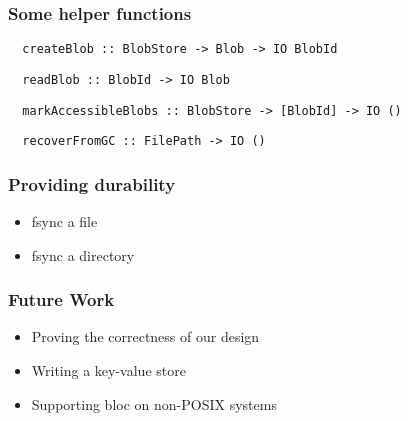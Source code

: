 \documentclass[10pt]{beamer}
\begin{document}
\begin{frame}[fragile]
  \frametitle{Some helper functions}
  \begin{verbatim}
  createBlob :: BlobStore -> Blob -> IO BlobId
  \end{verbatim}
  \pause
  \begin{verbatim}
  readBlob :: BlobId -> IO Blob
  \end{verbatim}
  \pause
  \begin{verbatim}
  markAccessibleBlobs :: BlobStore -> [BlobId] -> IO ()
  \end{verbatim}
  \pause
  \begin{verbatim}
  recoverFromGC :: FilePath -> IO ()
  \end{verbatim}
\end{frame}

\begin{frame}
  \frametitle{Providing durability}
  \begin{itemize}[<+->]
    \item fsync a file
    \item fsync a directory
  \end{itemize}
\end{frame}

\begin{frame}
  \frametitle{Future Work}
  \begin{itemize}[<+->]
    \item Proving the correctness of our design
    \item Writing a key-value store
    \item Supporting bloc on non-POSIX systems
  \end{itemize}
\end{frame}
\end{document}
